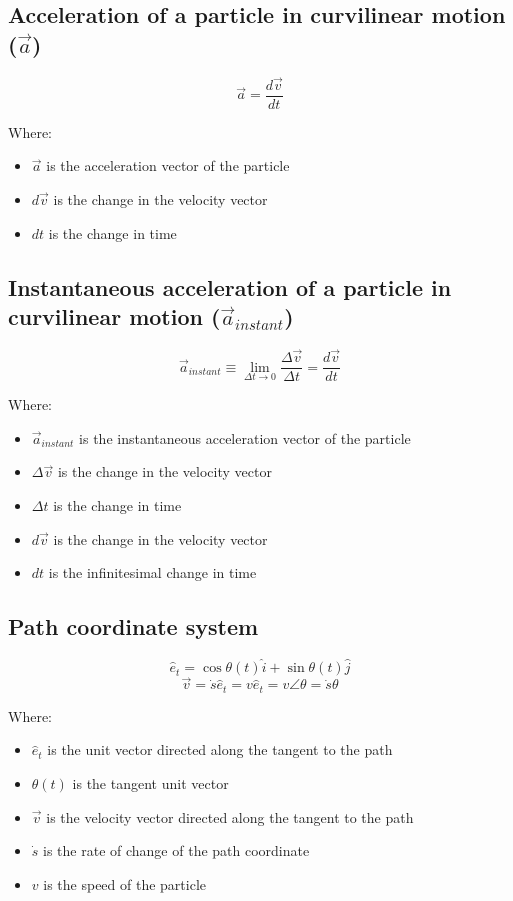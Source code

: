 \documentclass[11pt]{article}
\begin{document}
\subsection{Acceleration of a particle in curvilinear motion (\(\vec{a}\))}
\label{sec:org64e3d49}
\[\vec{a} = \frac{d \vec{v}}{dt}\]

Where:
\begin{itemize}
\item \(\vec{a}\) is the acceleration vector of the particle
\item \(d \vec{v}\) is the change in the velocity vector
\item \(dt\) is the change in time
\end{itemize}
\subsection{Instantaneous acceleration of a particle in curvilinear motion (\(\vec{a}_{instant}\))}
\label{sec:org0a2013a}
\[\vec{a}_{instant} \equiv \lim_{\Delta t \rightarrow 0} \frac{\Delta \vec{v}}{\Delta t} = \frac{d \vec{v}}{dt}\]

Where:
\begin{itemize}
\item \(\vec{a}_{instant}\) is the instantaneous acceleration vector of the particle
\item \(\Delta \vec{v}\) is the change in the velocity vector
\item \(\Delta t\) is the change in time
\item \(d \vec{v}\) is the change in the velocity vector
\item \(dt\) is the infinitesimal change in time
\end{itemize}
\subsection{Path coordinate system}
\label{sec:org9765863}
\[\hat{e}_t = \cos \theta (t) \hat{i} + \sin \theta (t) \hat{j}\]
\[\vec{v} = \dot{s} \hat{e}_t = v \hat{e}_t = v \angle \theta = \dot{s} \theta\]

Where:
\begin{itemize}
\item \(\hat{e}_t\) is the unit vector directed along the tangent to the path
\item \(\theta (t)\) is the tangent unit vector
\item \(\vec{v}\) is the velocity vector directed along the tangent to the path
\item \(\dot{s}\) is the rate of change of the path coordinate
\item \(v\) is the speed of the particle
\end{itemize}
\end{document}
